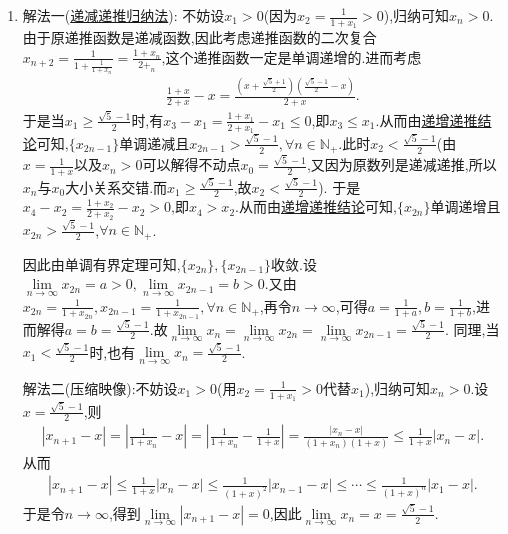 \documentclass[lang=cn,newtx,10pt,scheme=chinese]{elegantbook}
\begin{document}
\begin{solution}
\begin{enumerate}
   \item 
   {\color{blue}解法一(\hyperref[proposition:递减函数递推数列]{递减递推归纳法}):}
   不妨设$x_1>0$(因为$x_2=\frac{1}{1+x_1}>0$),归纳可知$x_n>0$.由于原递推函数是递减函数,因此考虑递推函数的二次复合$x_{n+2}=\frac{1}{1+\frac{1}{1+x_n}}=\frac{1+x_n}{2+_n}$,这个递推函数一定是单调递增的.进而考虑
   \begin{align*}
      \frac{1+x}{2+x}-x=\frac{\left( x+\frac{\sqrt{5}+1}{2} \right) \left( \frac{\sqrt{5}-1}{2}-x \right)}{2+x}.
   \end{align*}
于是当$x_1\geq \frac{\sqrt{5}-1}{2}$时,有$x_3-x_1=\frac{1+x_1}{2+x_1}-x_1\leqslant 0$,即$x_3\leqslant x_1$.从而由\hyperref[proposition:递增函数递推数列]{递增递推结论}可知,$\{x_{2n-1}\}$单调递减且$x_{2n-1}>\frac{\sqrt{5}-1}{2},\forall n \in \mathbb{N}_+$.此时\(x_2<\frac{\sqrt{5}-1}{2}\)(由\(x = \frac{1}{1 + x}\)以及$x_n>0$可以解得不动点\(x_0=\frac{\sqrt{5}-1}{2}\),又因为原数列是递减递推,所以\(x_n\)与\(x_0\)大小关系交错.而\(x_1\geqslant\frac{\sqrt{5}-1}{2}\),故\(x_2<\frac{\sqrt{5}-1}{2}\)).
于是\(x_4 - x_2=\frac{1 + x_2}{2 + x_2}-x_2>0\),即\(x_4>x_2\).从而由\hyperref[proposition:递增函数递推数列]{递增递推结论}可知,\(\{x_{2n}\}\)单调递增且\(x_{2n}>\frac{\sqrt{5}-1}{2}\),\(\forall n\in\mathbb{N}_+\).

因此由单调有界定理可知,$\{x_{2n}\},\{x_{2n-1}\}$收敛.设$\underset{n\rightarrow \infty}{\lim}x_{2n}=a>0,\underset{n\rightarrow \infty}{\lim}x_{2n-1}=b>0$.又由$x_{2n}=\frac{1}{1+x_{2n}},x_{2n-1}=\frac{1}{1+x_{2n-1}},\forall n\in \mathbb{N}_+$,再令$n\to \infty$,可得$a=\frac{1}{1+a},b=\frac{1}{1+b}$,进而解得$a=b=\frac{\sqrt{5}-1}{2}$.故$\underset{n\rightarrow \infty}{\lim}x_n=\underset{n\rightarrow \infty}{\lim}x_{2n}=\underset{n\rightarrow \infty}{\lim}x_{2n-1}=\frac{\sqrt{5}-1}{2}$.
同理,当$x_1<\frac{\sqrt{5}-1}{2}$时,也有$\underset{n\rightarrow \infty}{\lim}x_n=\frac{\sqrt{5}-1}{2}$.

{\color{blue}解法二(压缩映像):}不妨设$x_1>0$(用$x_2=\frac{1}{1+x_1}>0$代替$x_1$),归纳可知$x_n>0$.设$x=\frac{\sqrt{5}-1}{2}$,则
\begin{align*}
   \left| x_{n+1}-x \right|=\left| \frac{1}{1+x_n}-x \right|=\left| \frac{1}{1+x_n}-\frac{1}{1+x} \right|=\frac{\left| x_n-x \right|}{\left( 1+x_n \right) \left( 1+x \right)}\leqslant \frac{1}{1+x}\left| x_n-x \right|.
\end{align*}
从而
\begin{align*}
   \left| x_{n+1}-x \right|\leqslant \frac{1}{1+x}\left| x_n-x \right|\leqslant \frac{1}{\left( 1+x \right) ^2}\left| x_{n-1}-x \right|\leqslant \cdots \leqslant \frac{1}{\left( 1+x \right) ^n}\left| x_1-x \right|.
\end{align*}
于是令$n\to\infty$,得到$\underset{n\rightarrow \infty}{\lim}\left| x_{n+1}-x \right|=0$,因此$\underset{n\rightarrow \infty}{\lim}x_n=x=\frac{\sqrt{5}-1}{2}$.


\end{enumerate}
\end{solution}
\end{document}
